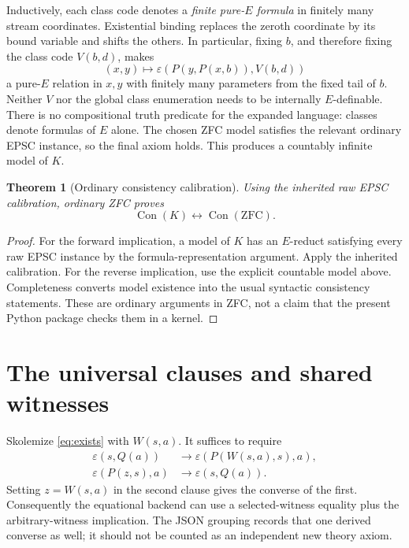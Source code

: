 \documentclass[11pt]{article}
\newtheorem{theorem}{Theorem}
\newcommand{\eps}{\varepsilon}
\newcommand{\Con}{\operatorname{Con}}
\begin{document}
Inductively, each class code denotes a \emph{finite pure-$E$ formula} in finitely many stream coordinates. Existential binding replaces the zeroth coordinate by its bound variable and shifts the others. In particular, fixing $b$, and therefore fixing the class code $V(b,d)$, makes
\[
 (x,y)\longmapsto\eps(P(y,P(x,b)),V(b,d))
\]
a pure-$E$ relation in $x,y$ with finitely many parameters from the fixed tail of $b$. Neither $V$ nor the global class enumeration needs to be internally $E$-definable. There is no compositional truth predicate for the expanded language: classes denote formulas of $E$ alone. The chosen ZFC model satisfies the relevant ordinary EPSC instance, so the final axiom holds. This produces a countably infinite model of $K$.

\begin{theorem}[Ordinary consistency calibration]
Using the inherited raw EPSC calibration, ordinary ZFC proves
\[
 \Con(K)\leftrightarrow\Con(\mathrm{ZFC}).
\]
\end{theorem}
\begin{proof}
For the forward implication, a model of $K$ has an $E$-reduct satisfying every raw EPSC instance by the formula-representation argument. Apply the inherited calibration. For the reverse implication, use the explicit countable model above. Completeness converts model existence into the usual syntactic consistency statements. These are ordinary arguments in ZFC, not a claim that the present Python package checks them in a kernel.
\end{proof}

\section{The universal clauses and shared witnesses}

Skolemize \eqref{eq:exists} with $W(s,a)$. It suffices to require
\begin{align*}
 \eps(s,Q(a))&\to\eps(P(W(s,a),s),a),\\
 \eps(P(z,s),a)&\to\eps(s,Q(a)).
\end{align*}
Setting $z=W(s,a)$ in the second clause gives the converse of the first. Consequently the equational backend can use a selected-witness equality plus the arbitrary-witness implication. The JSON grouping records that one derived converse as well; it should not be counted as an independent new theory axiom.
\end{document}
